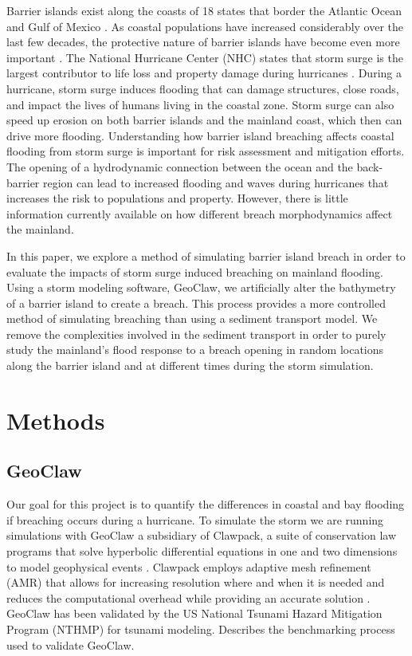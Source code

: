 \documentclass{coastal_paper}
\begin{document}
Barrier islands exist along the coasts of 18 states that border the Atlantic Ocean and Gulf of Mexico \citep{Zhang2011}. As coastal populations have increased considerably over the last few decades, the protective nature of barrier islands have become even more important \citep{Zhang2011}. The National Hurricane Center (NHC) states that storm surge  is the largest contributor to life loss and property damage during hurricanes \citep{Center2006}. During a hurricane, storm surge induces flooding that can damage structures, close roads, and impact the lives of humans living in the coastal zone. Storm surge can also speed up erosion on both barrier islands and the mainland coast, which then can drive more flooding. Understanding how barrier island breaching affects coastal flooding from storm surge is important for risk assessment and mitigation efforts. The opening of a hydrodynamic connection between the ocean and the back-barrier region can lead to increased flooding and waves during hurricanes that increases the risk to populations and property. However, there is little information currently available on how different breach morphodynamics affect the mainland.

In this paper, we explore a method of simulating barrier island breach in order to evaluate the impacts of storm surge induced breaching on mainland flooding. Using a storm modeling software, GeoClaw, we artificially alter the bathymetry of a barrier island to create a breach. This process provides a more controlled method of simulating breaching than using a sediment transport model. We remove the complexities involved in the sediment transport in order to purely study the mainland's flood response to a breach opening in random locations along the barrier island and at different times during the storm simulation. 

\section{Methods}
\subsection*{GeoClaw}
Our goal for this project is to quantify the differences in coastal and bay flooding if breaching occurs during a hurricane. To simulate the storm we are running simulations with GeoClaw a subsidiary of Clawpack, a suite of conservation law programs that solve hyperbolic differential equations in one and two dimensions to model geophysical events \citep{clawpack, mandli2016clawpack}. Clawpack employs adaptive mesh refinement (AMR) that allows for increasing resolution where and when it is needed and reduces the computational overhead while providing an accurate solution \citep{Berger2011TheRefinement}. GeoClaw has been validated by the US National Tsunami Hazard Mitigation Program (NTHMP) for tsunami modeling. \citep{gonzalez2011validation} Describes the benchmarking process used to validate GeoClaw. 
\end{document}

